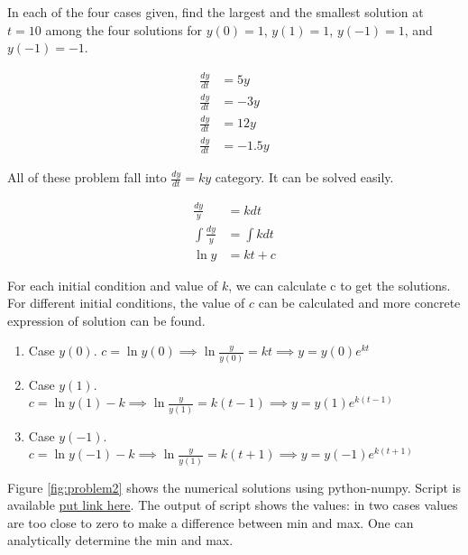 \begin{questions}
\question

In each of the four cases given, find the largest and the smallest
solution at $t=10$ among the four solutions for $y(0) 
= 1$, $y(1) = 1$, $y(-1)=1$, and $y(-1) = -1$.

\begin{align}
    \frac{dy}{dt} &= 5y \\
    \frac{dy}{dt} &= -3 y \\
    \frac{dy}{dt} &= 12y \\
    \frac{dy}{dt} &= -1.5y
\end{align}


\begin{solution}

All of these problem fall into $\frac{dy}{dt} = ky$ category.  It can be solved
easily.

\begin{align*}
    \frac{dy}{y} &= k dt \\
    \int \frac{dy}{y} &= \int k dt \\
    \ln y &=  k t + c 
\end{align*}

For each initial condition and value of $k$, we can calculate c to get the
solutions. For different initial conditions, the value of $c$ can be calculated
and more concrete expression of solution can be found.

\begin{enumerate}
    \item Case $y(0)$. $c = \ln y(0)  \implies \ln \frac{y}{y(0)} = kt \implies
        y = y(0) e^{kt} $
    \item Case $y(1)$. $c = \ln y(1) - k  \implies \ln \frac{y}{y(1)} = k(t-1)
        \implies y = y(1) e^{k(t-1)} $
    \item Case $y(-1)$. $c = \ln y(-1) - k  \implies \ln \frac{y}{y(1)} = k(t+1)
        \implies y = y(-1) e^{k(t+1)}$
\end{enumerate}

Figure \ref{fig:problem2} shows the numerical solutions using python-numpy.
Script is available \href{put link here}{put link here}. The output of script
shows the values: in two cases values are too close to zero to make a
difference between min and max. One can analytically determine the min and max. 


\end{solution}
\end{questions}
